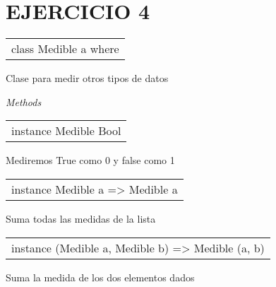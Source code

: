 \section{EJERCICIO 4}
\begin{haddockdesc}
\item[\begin{tabular}{@{}l}
class Medible a where
\end{tabular}]
{\haddockbegindoc
Clase para medir otros tipos de datos\par
\haddockpremethods{}\emph{Methods}
}
\end{haddockdesc}
\begin{haddockdesc}
\item[\begin{tabular}{@{}l}
instance Medible Bool
\end{tabular}]
{\haddockbegindoc
Mediremos True como 0  y false como 1\par}
\end{haddockdesc}
\begin{haddockdesc}
\item[\begin{tabular}{@{}l}
instance Medible a => Medible {\char 91}a{\char 93}
\end{tabular}]
{\haddockbegindoc
Suma todas las medidas de la lista\par}
\end{haddockdesc}
\begin{haddockdesc}
\item[\begin{tabular}{@{}l}
instance (Medible a, Medible b) => Medible (a, b)
\end{tabular}]
{\haddockbegindoc
Suma la medida de los dos elementos dados\par}
\end{haddockdesc}